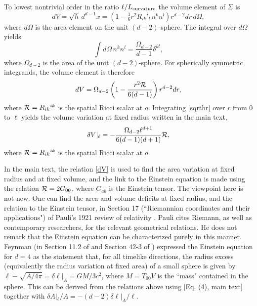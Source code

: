 \documentclass[aps,prd,showpacs,groupedaddress,nofootinbib,longbibliography,12pt]{revtex4-1}
\def\beq{\begin{equation}}
\def\eeq{\end{equation}}
\def\d{\delta}\def\D{\Delta}
\def\O{\Omega}
\begin{document}
To lowest nontrivial order in the ratio $\ell/L_{\rm curvature}$
the volume element of $\Sigma$  is 
%
\beq\label{sqrth}
dV =\sqrt{h}\, d^{d-1}x =(1 - \tfrac16 r^2 R_{ik}{}^{i}{}_l\, n^k n^l)r^{d-2}dr\, d\O,
\eeq
%
where $d\O$ is the area element on the unit $(d-2)$-sphere.  
The integral over $d\O$ yields
%
\beq\label{intnn}
\int d\O \,n^kn^l = \frac{\O_{d-2}}{d-1}\d^{kl},
\eeq
where 
$\O_{d-2}$ is the area of the unit $(d-2)$-sphere. For spherically
symmetric integrands, the volume element is therefore 
%
\beq\label{sqrthr}
dV =\O_{d-2}\left(1 - \frac{r^2{\cal R}}{6(d-1)}\right)r^{d-2}dr,
\eeq
%
where ${\cal R}=R_{ik}{}^{ik}$ is the spatial Ricci scalar  at $o$.
Integrating \eqref{sqrthr} over $r$ from 0 to $\ell$ yields 
the volume variation at fixed radius written in the main text, 
%
\beq\label{dV}
\d V|_{\ell} = -\frac{\O_{d-2}\ell^{d+1}}{6(d-1)(d+1)}{\cal R},
\eeq
%
where ${\cal R}=R_{ik}{}^{ik}$ is the spatial Ricci scalar  at $o$.

In the main text, the relation \eqref{dV} is used to find the area variation
at fixed radius and at fixed volume, and the link to the Einstein
equation is made using the relation ${\cal R}=2G_{00}$, where 
$G_{ab}$ is the Einstein tensor.
The viewpoint here is not new. One can find 
the area and volume deficits at fixed radius, and the relation to the Einstein tensor,  
in Section 17 (``Riemannian coordinates and their applications") of Pauli's 1921 review of relativity \cite{PauliEncyc}.
 Pauli cites Riemann, as well as contemporary researchers, for the relevant geometrical relations.  He does not remark that the Einstein equation can be characterized purely in this manner. 
Feynman (in Section 11.2 of \cite{FeynmanGrav} and Section 42-3 of \cite{Feynman}) 
 expressed the Einstein equation for $d=4$ as the statement that, for all timelike directions,
the radius excess (equivalently the radius variation at fixed area) of a small sphere is given by  
$\ell - \sqrt{A/4\pi}=\d \ell|_A = GM/3c^2$, where $M=T_{00}V$ is the ``mass" contained in the sphere.
This can be derived from the relations above using %
[Eq. (4), main text]
together with 
$\d A|_\ell/A = -(d-2)\d \ell|_A/\ell$. 
\end{document}
